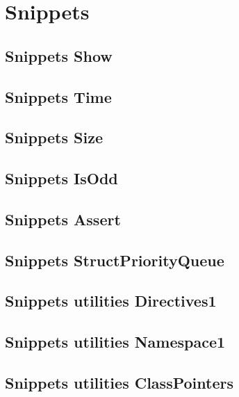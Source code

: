 \section{Snippets}
\subsection{Snippets Show}
\raggedbottom
\hrulefill
\subsection{Snippets Time}
\raggedbottom
\hrulefill
\subsection{Snippets Size}
\raggedbottom
\hrulefill
\subsection{Snippets IsOdd}
\raggedbottom
\hrulefill
\subsection{Snippets Assert}
\raggedbottom
\hrulefill
\subsection{Snippets StructPriorityQueue}
\raggedbottom
\hrulefill
\subsection{Snippets utilities Directives1}
\raggedbottom
\hrulefill
\subsection{Snippets utilities Namespace1}
\raggedbottom
\hrulefill
\subsection{Snippets utilities ClassPointers}
\raggedbottom
\hrulefill

